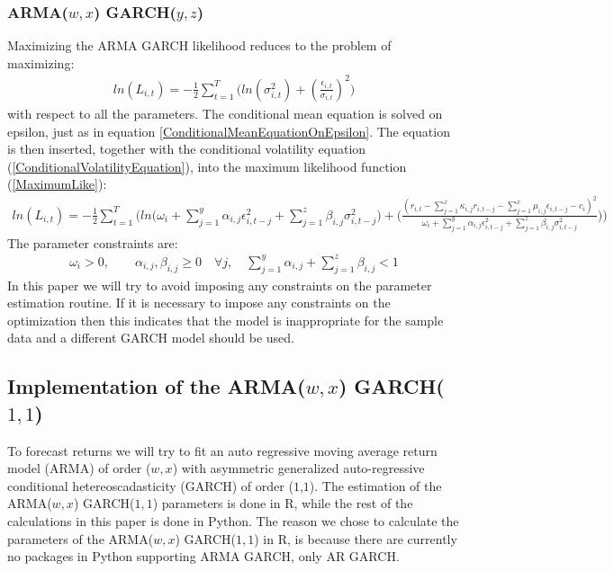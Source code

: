 \subsubsection{ARMA($w,x$) GARCH($y,z$)}
Maximizing the ARMA GARCH likelihood reduces to the problem of maximizing:
\begin{align} 
    ln(L_{i,t})=-\frac{1}{2}\sum_{t=1}^T\bigg( ln(\sigma_{i,t}^2)+(\frac{\epsilon_{i,t}}{\sigma_{i,t}})^2\bigg)   \label{MaximumLike}
\end{align}
with respect to all the parameters. The conditional mean equation is solved on epsilon, just as in equation \ref{ConditionalMeanEquationOnEpsilon}. The equation is then inserted, together with the conditional volatility equation (\ref{ConditionalVolatilityEquation}), into the maximum likelihood function (\ref{MaximumLike}):
\begin{align} 
    ln(L_{i,t})=-\frac{1}{2}\sum_{t=1}^T \Bigg(ln\Big(\omega_i + \sum_{j=1}^y\alpha_{i,j}\epsilon_{i,t-j}^2+\sum_{j=1}^z\beta_{i,j}\sigma_{i,t-j}^2\big)+\Big(\frac{(r_{i,t}-\sum_{j=1}^x\kappa_{i,j} r_{i,t-j}-\sum_{j=1}^x\mu_{i,j} \epsilon_{i,t-j}-c_i)^2}{\omega_i + \sum_{j=1}^y \alpha_{i,j} \epsilon_{i,t-j}^2 +\sum_{j=1}^z\beta_{i,j}\sigma_{i,t-j}^2}\Big)\Bigg)   \label{fullMaximumLike}
\end{align}
The parameter constraints are:
\begin{align} 
    \omega_i>0,\quad\quad \alpha_{i,j},\beta_{i,j}\geq0 \quad \forall j, \quad \sum_{j=1}^y\alpha_{i,j}+\sum_{j=1}^z\beta_{i,j}<1 \label{ParameterConstraints}
\end{align}
In this paper we will try to avoid imposing any constraints on the parameter estimation routine. If it is necessary to impose any constraints on the optimization then this indicates that the model is inappropriate for the sample data and a different GARCH model should be used.

\subsection*{Implementation of the ARMA($w,x$) GARCH($1,1$)}
To forecast returns we will try to fit an auto regressive moving average return model (ARMA) of order ($w,x$) with asymmetric generalized auto-regressive conditional hetereoscadasticity (GARCH) of order ($1$,$1$). The estimation of the ARMA($w,x$) GARCH($1,1$) parameters is done in R, while the rest of the calculations in this paper is done in Python. The reason we chose to calculate the parameters of the ARMA($w,x$) GARCH($1,1$) in R, is because there are currently no packages in Python supporting ARMA GARCH, only AR GARCH. 

